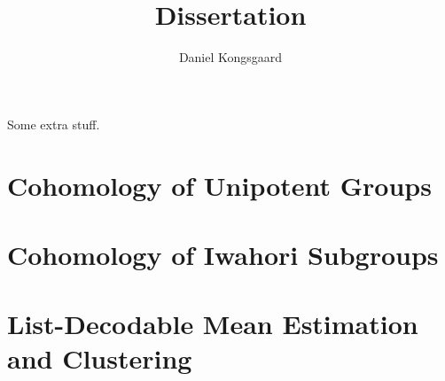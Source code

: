 \documentclass[letterpaper,oneside,english,11pt,openany]{memoir}
\title{Dissertation}
\author{Daniel Kongsgaard}
\begin{document}
\OnehalfSpacing


\frontmatter



\tableofcontents*

\clearpage

\begin{vplace}[0.7]
  Some extra stuff.
\end{vplace}

\clearpage

\mainmatter

\chapter{Cohomology of Unipotent Groups}%
\label{cha:cohunigps}



\chapter{Cohomology of Iwahori Subgroups}%
\label{cha:cohiwagps}



\chapter{List-Decodable Mean Estimation and Clustering}%
\label{cha:robstat}



\clearpage

\backmatter

\printbibliography

\clearpage

\printnomenclature[4cm]

\clearpage

\printindex
\end{document}
